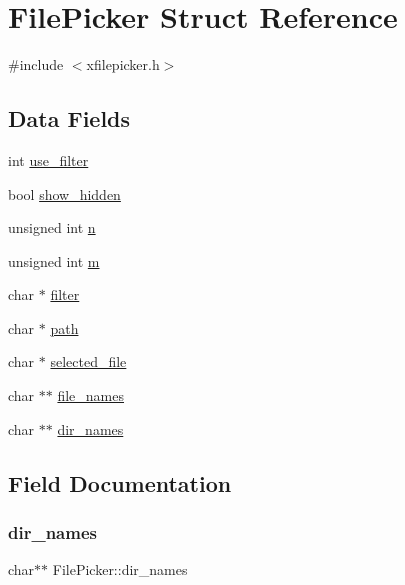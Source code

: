 \hypertarget{structFilePicker}{}\section{File\+Picker Struct Reference}
\label{structFilePicker}


{\ttfamily \#include $<$xfilepicker.\+h$>$}

\subsection*{Data Fields}
\begin{DoxyCompactItemize}
\item 
int \hyperlink{structFilePicker_a66385fe305358fe8b35d644a635bc7ec}{use\+\_\+filter}
\item 
bool \hyperlink{structFilePicker_ab4a445c6af3f5976d68eb686a88da0cb}{show\+\_\+hidden}
\item 
unsigned int \hyperlink{structFilePicker_acccd2c8eac93bc7c3aff6c4546278749}{n}
\item 
unsigned int \hyperlink{structFilePicker_a6bec7b4734c7f1d78967c4f4f71906ce}{m}
\item 
char $\ast$ \hyperlink{structFilePicker_ab38e2e630e60e830a4a033a165085ec1}{filter}
\item 
char $\ast$ \hyperlink{structFilePicker_a35302148e7c12050c9696d4368b151c8}{path}
\item 
char $\ast$ \hyperlink{structFilePicker_acda152e4ecd89399223670d73f70c2fe}{selected\+\_\+file}
\item 
char $\ast$$\ast$ \hyperlink{structFilePicker_aeb05635b87b9631c94f33babc78ceaf2}{file\+\_\+names}
\item 
char $\ast$$\ast$ \hyperlink{structFilePicker_a51f24c447003a0234e90caf3665a8e46}{dir\+\_\+names}
\end{DoxyCompactItemize}


\subsection{Field Documentation}
\mbox{\label{structFilePicker_a51f24c447003a0234e90caf3665a8e46}} 
\subsubsection{\texorpdfstring{dir\+\_\+names}{dir\_names}}
{\footnotesize\ttfamily char$\ast$$\ast$ File\+Picker\+::dir\+\_\+names}

